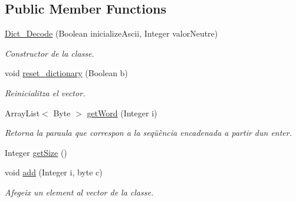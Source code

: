 \subsection*{Public Member Functions}
\begin{DoxyCompactItemize}
\item 
\hyperlink{classdomini_1_1utils_1_1Dict__Decode_a8a0f9e67c530bafc031e72c218ce74f8}{Dict\+\_\+\+Decode} (Boolean inicialize\+Ascii, Integer valor\+Neutre)
\begin{DoxyCompactList}\small\item\em Constructor de la classe. \end{DoxyCompactList}\item 
void \hyperlink{classdomini_1_1utils_1_1Dict__Decode_a635432505df1ceaa58a987bb80c6b0a3}{reset\+\_\+dictionary} (Boolean b)
\begin{DoxyCompactList}\small\item\em Reinicialitza el vector. \end{DoxyCompactList}\item 
Array\+List$<$ Byte $>$ \hyperlink{classdomini_1_1utils_1_1Dict__Decode_a0f6457460aefe9df50f0cad48f58feee}{get\+Word} (Integer i)
\begin{DoxyCompactList}\small\item\em Retorna la paraula que correspon a la seqüència encadenada a partir d\textquotesingle{}un enter. \end{DoxyCompactList}\item 
Integer \hyperlink{classdomini_1_1utils_1_1Dict__Decode_aac69020c3515649e8c2d70e2908e3f3e}{get\+Size} ()
\item 
void \hyperlink{classdomini_1_1utils_1_1Dict__Decode_a077011e4507db308d143ea9b7146abb9}{add} (Integer i, byte c)
\begin{DoxyCompactList}\small\item\em Afegeix un element al vector de la classe. \end{DoxyCompactList}\end{DoxyCompactItemize}

